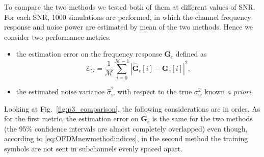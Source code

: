\documentclass[10pt]{article}
\newcommand{\ofdM} {\mathcal{M}}
\begin{document}
To compare the two methods we tested both of them at different values of SNR. For each SNR, 1000 simulations are performed, in which the channel frequency response and noise power are estimated by mean of the two methods. Hence we consider two performance metrics:
\begin{itemize}
	\item the estimation error on the frequency response $\mathbf{G}_c$ defined as
		\begin{equation}
			\mathcal{E}_G = \dfrac{1}{\ofdM} \sum_{i=0}^{\ofdM - 1} \left| \mathbf{\hat{G}}_c [i] - \mathbf{G}_c [i] \right|^2,
		\end{equation}
	\item the estimated noise variance $\hat{\sigma}_w^2$ with respect to the true $\sigma_w^2$ known \textit{a priori}.
\end{itemize}

Looking at Fig.~\ref{fig:p3_comparison}, the following considerations are in order. As for the first metric, the estimation error on $\mathbf{G}_c$ is the same for the two methods (the 95\% confidence intervals are almost completely overlapped) even though, according to \eqref{eq:OFDMnewmethodindices}, in the second method the training symbols are not sent in subchannels evenly spaced apart.
\end{document}
